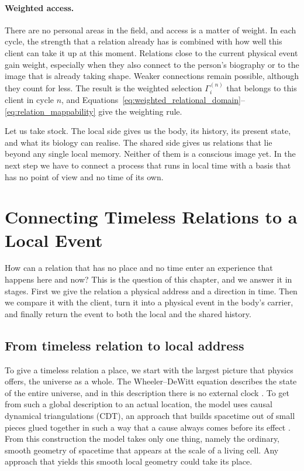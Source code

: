 \paragraph{Weighted access.}
There are no personal areas in the field, and access is a matter of weight. In each cycle,
the strength that a relation already has is combined with how well this client can
take it up at this moment. Relations close to the current physical event gain weight,
especially when they also connect to the person's biography or to the image that is
already taking shape. Weaker connections remain possible, although they count for less. The
result is the weighted selection $\Gamma_i^{(n)}$ that belongs to this client in cycle
$n$, and
Equations~\eqref{eq:weighted_relational_domain}--\eqref{eq:relation_mappability}
give the weighting rule.

Let us take stock. The local side gives us the body, its history, its present state,
and what its biology can realise. The shared side gives us relations that lie beyond
any single local memory. Neither of them is a conscious image yet. In the next step we
have to connect a process that runs in local time with a basis that has no point of
view and no time of its own.

\section{Connecting Timeless Relations to a Local Event}
\label{sec:coupling_rendering}

How can a relation that has no place and no time enter an experience that happens
here and now? This is the question of this chapter, and we answer it in stages. First
we give the relation a physical address and a direction in time. Then we compare it
with the client, turn it into a physical event in the body's carrier, and finally
return the event to both the local and the shared history.

\subsection{From timeless relation to local address}

To give a timeless relation a place, we start with the largest picture that physics
offers, the universe as a whole. The Wheeler--DeWitt equation describes the state of the entire universe,
and in this description there is no external clock \citep{dewitt1967}. To get from
such a global description to an actual location, the model uses causal dynamical
triangulations (CDT), an approach that builds spacetime out of small pieces glued
together in such a way that a cause always comes before its effect
\citep{ambjorn2004}. From this construction the model takes only one thing, namely the
ordinary, smooth geometry of spacetime that appears at the scale of a living cell.
Any approach that yields this smooth local geometry could take its place.

